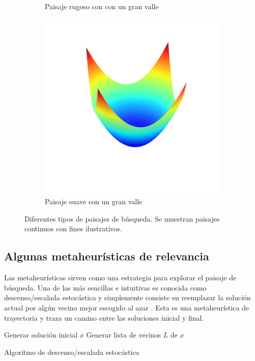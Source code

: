 \begin{figure}[H]
\begin{subfigure}{.5\textwidth}
    \caption{Paisaje rugoso con con un gran valle}
\end{subfigure}
\begin{subfigure}{\textwidth}
    \centering
    \includegraphics[scale=.4]{Imagenes/smoothvalley.png}
    \caption{Paisaje suave con un gran valle}
\end{subfigure}
\caption{Diferentes tipos de paisajes de búsqueda. Se muestran paisajes continuos con fines ilustrativos.}
    \label{fig:landtypes}
\end{figure}

\subsection*{Algunas metaheurísticas de relevancia}
Las metaheurísticas sirven como una estrategia para explorar el paisaje de búsqueda. 
%
Una de las más sencillas e intuitivas es conocida como descenso/escalada estocástica y simplemente consiste en reemplazar la solución actual por algún vecino mejor 
escogido al azar .%
Esta es una metaheurística de trayectoria y traza un camino entre las soluciones inicial y final.

%
\begin{algorithm}[H]
 Generar solución inicial $x$\;
 Generar lista de vecinos $L$ de $x$\;
    \label{alg:LS}
    \caption{Algoritmo de descenso/escalada estocástica}
\end{algorithm}

